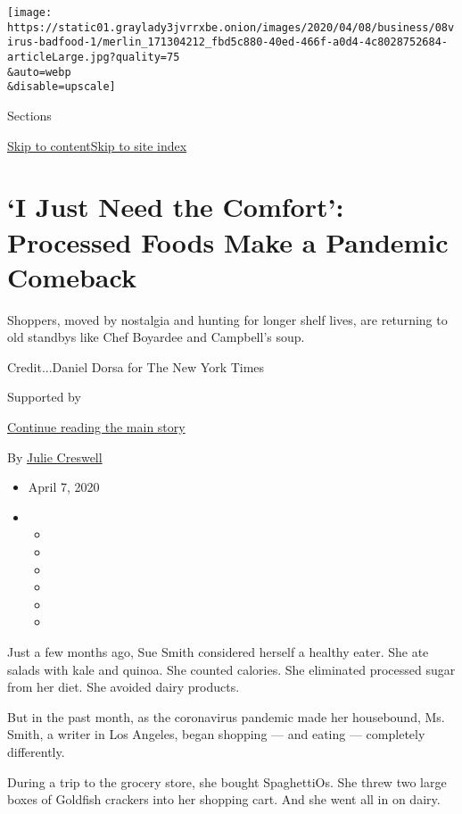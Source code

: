 \texttt{[image: https://static01.graylady3jvrrxbe.onion/images/2020/04/08/business/08virus-badfood-1/merlin\_171304212\_fbd5c880-40ed-466f-a0d4-4c8028752684-articleLarge.jpg?quality=75\\\&auto=webp\\\&disable=upscale]}

Sections

\protect\hyperlink{site-content}{Skip to
content}\protect\hyperlink{site-index}{Skip to site index}

\hypertarget{i-just-need-the-comfort-processed-foods-make-a-pandemic-comeback}{%
\section{`I Just Need the Comfort': Processed Foods Make a Pandemic
Comeback}\label{i-just-need-the-comfort-processed-foods-make-a-pandemic-comeback}}

Shoppers, moved by nostalgia and hunting for longer shelf lives, are
returning to old standbys like Chef Boyardee and Campbell's soup.

Credit...Daniel Dorsa for The New York Times

Supported by

\protect\hyperlink{after-sponsor}{Continue reading the main story}

By \href{https://www.nytimes3xbfgragh.onion/by/julie-creswell}{Julie
Creswell}

\begin{itemize}
\item
  April 7, 2020
\item
  \begin{itemize}
  \item
  \item
  \item
  \item
  \item
  \item
  \end{itemize}
\end{itemize}

Just a few months ago, Sue Smith considered herself a healthy eater. She
ate salads with kale and quinoa. She counted calories. She eliminated
processed sugar from her diet. She avoided dairy products.

But in the past month, as the coronavirus pandemic made her housebound,
Ms. Smith, a writer in Los Angeles, began shopping --- and eating ---
completely differently.

During a trip to the grocery store, she bought SpaghettiOs. She threw
two large boxes of Goldfish crackers into her shopping cart. And she
went all in on dairy.

